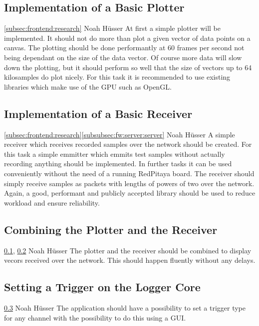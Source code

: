 \documentclass[a4paper,oneside]{alpenspecs/alpenspecs}
\begin{document}
\subsection{Implementation of a Basic Plotter}
\label{subsec:frontend:plotter}
\wpac
    {}
    {}
    {}
    {\ref{subsec:frontend:research}}
    {}
    {Noah Hüsser}
    {%
        At first a simple plotter will be implemented. It should not do more than plot a given vector of data points on a canvas.
        The plotting should be done performantly at 60 frames per second not being dependant on the size of the data vector.
        Of course more data will slow down the plotting, but it should perform so well that the size of vectors up to 64 kilosamples do plot nicely.
        For this task it is recommended to use existing libraries which make use of the GPU such as OpenGL.
    }

\subsection{Implementation of a Basic Receiver}
\label{subsec:frontend:receiver}
\wpac
    {}
    {}
    {}
    {\ref{subsec:frontend:research}\ref{subsubsec:fw:server:server}}
    {}
    {Noah Hüsser}
    {%
        A simple receiver which receives recorded samples over the network should be created.
        For this task a simple emmitter which emmits test samples without actually recording anything should be implemented.
        In further tasks it can be used conveniently without the need of a running RedPitaya board.
        The receiver should simply receive samples as packets with lengths of powers of two over the network.
        Again, a good, performant and publicly accepted library should be used to reduce workload and ensure reliability.
    }

\subsection{Combining the Plotter and the Receiver}
\label{subsec:frontend:combining}
\wpac
    {}
    {}
    {}
    {\ref{subsec:frontend:plotter}, \ref{subsec:frontend:receiver}}
    {}
    {Noah Hüsser}
    {%
        The plotter and the receiver should be combined to display vecors received over the network.
        This should happen fluently without any delays.
    }

\subsection{Setting a Trigger on the Logger Core}
\label{subsec:frontend:trig}
\wpac
    {}
    {}
    {}
    {\ref{subsec:frontend:combining}}
    {}
    {Noah Hüsser}
    {%
        The application should have a possibility to set a trigger type for any channel with the possibility to do this using a GUI.
    }
\end{document}

